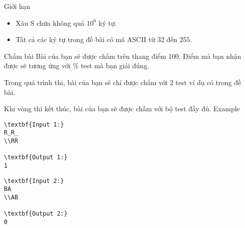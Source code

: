 Giới hạn  
\begin{itemize}
	\item     Xâu S chứa không quá $10^{6}$    ký tự.   
	\item     Tất cả các ký tự trong đề bài có mã ASCII từ 32 đến 255.   
\end{itemize}
   Chấm bài  
Bài của bạn sẽ được chấm trên thang điểm 100. Điểm mà bạn nhận được sẽ tương ứng với \% test mà bạn giải đúng.  

   Trong quá trình thi, bài của bạn sẽ chỉ được chấm với 2 test ví dụ có trong đề bài.  

   Khi vòng thi kết thúc, bài của bạn sẽ được chấm với bộ test đầy đủ.
   Example  
\begin{verbatim}
\textbf{Input 1:}
R_R_
\\RR

\textbf{Output 1:}
1
\end{verbatim}
\begin{verbatim}
\textbf{Input 2:}
BA
\\AB

\textbf{Output 2:}
0\end{verbatim}